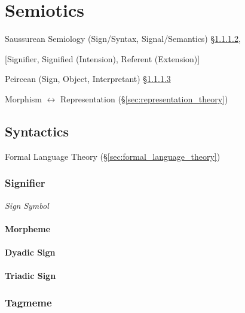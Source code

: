 \section{Semiotics}\label{sec:semiotics}

Saussurean Semiology (Sign/Syntax, Signal/Semantics)
\S\ref{sec:dyadic_sign},

[Signifier, Signified (Intension), Referent (Extension)]

Peircean (Sign, Object, Interpretant) \S\ref{sec:triadic_sign}

Morphism $\leftrightarrow$ Representation
(\S\ref{sec:representation_theory})



\subsection{Syntactics}\label{sec:syntactics}

Formal Language Theory (\S\ref{sec:formal_language_theory})

\subsubsection{Signifier}\label{sec:signifier}

\emph{Sign} \emph{Symbol}

\paragraph{Morpheme}\label{sec:morpheme}



\paragraph{Dyadic Sign}\label{sec:dyadic_sign}

\paragraph{Triadic Sign}\label{sec:triadic_sign}



\subsubsection{Tagmeme}\label{sec:tagmeme}



